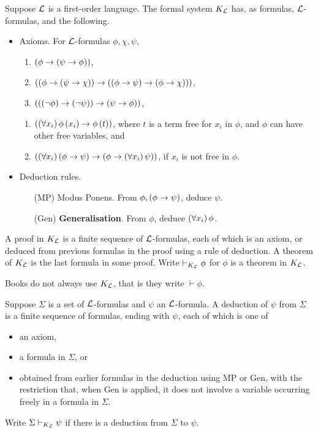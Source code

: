 \begin{definition}
Suppose $ \mathcal{L} $ is a first-order language. The formal system $ K_{\mathcal{L}} $ has, as formulas, $ \mathcal{L} $-formulas, and the following.
\begin{itemize}
\item Axioms. For $ \mathcal{L} $-formulas $ \phi, \chi, \psi $,
\begin{enumerate}[label=(A\arabic*)]
\item $ \left( \phi \rightarrow \left( \psi \rightarrow \phi \right) \right) $,
\item $ \left( \left( \phi \rightarrow \left( \psi \rightarrow \chi \right) \right) \rightarrow \left( \left( \phi \rightarrow \psi \right) \rightarrow \left( \phi \rightarrow \chi \right) \right) \right) $,
\item $ \left( \left( \left( \neg \phi \right) \rightarrow \left( \neg \psi \right) \right) \rightarrow \left( \psi \rightarrow \phi \right) \right) $,
\end{enumerate}
\begin{enumerate}[label=(K\arabic*)]
\item $ \left( \left( \forall x_i \right)\phi\left( x_i \right) \rightarrow \phi\left( t \right) \right) $, where $ t $ is a term free for $ x_i $ in $ \phi $, and $ \phi $ can have other free variables, and
\item $ \left( \left( \forall x_i \right)\left( \phi \rightarrow \psi \right) \rightarrow \left( \phi \rightarrow \left( \forall x_i \right)\psi \right) \right) $, if $ x_i $ is not free in $ \phi $.
\end{enumerate}
\item Deduction rules.
\begin{itemize}
\item[(MP)] Modus Ponens. From $ \phi, \left( \phi \rightarrow \psi \right) $, deduce $ \psi $.
\item[(Gen)] \textbf{Generalisation}. From $ \phi $, deduce $ \left( \forall x_i \right)\phi $.
\end{itemize}
\end{itemize}
A proof in $ K_{\mathcal{L}} $ is a finite sequence of $ \mathcal{L} $-formulas, each of which is an axiom, or deduced from previous formulas in the proof using a rule of deduction. A theorem of $ K_{\mathcal{L}} $ is the last formula in some proof. Write $ \vdash_{K_{\mathcal{L}}} \phi $ for $ \phi $ is a theorem in $ K_{\mathcal{L}} $.
\end{definition}

\begin{note*}
Books do not always use $ K_{\mathcal{L}} $, that is they write $ \vdash \phi $.
\end{note*}

\pagebreak

\begin{definition}
Suppose $ \Sigma $ is a set of $ \mathcal{L} $-formulas and $ \psi $ an $ \mathcal{L} $-formula. A deduction of $ \psi $ from $ \Sigma $ is a finite sequence of formulas, ending with $ \psi $, each of which is one of
\begin{itemize}
\item an axiom,
\item a formula in $ \Sigma $, or
\item obtained from earlier formulas in the deduction using MP or Gen, with the restriction that, when Gen is applied, it does not involve a variable occurring freely in a formula in $ \Sigma $.
\end{itemize}
Write $ \Sigma \vdash_{K_{\mathcal{L}}} \psi $ if there is a deduction from $ \Sigma $ to $ \psi $.
\end{definition}

